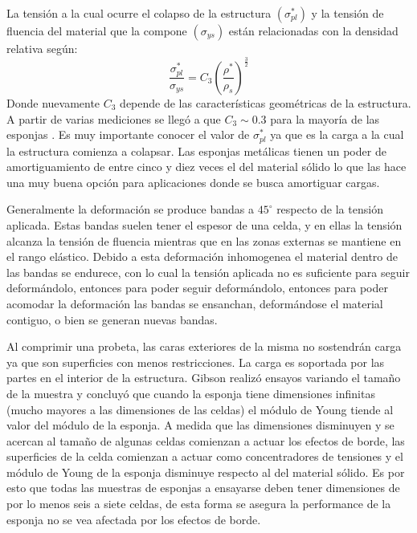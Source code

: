 \documentclass[a4paper,12pt,fleqn,twoside,openany]{book}
\begin{document}
La tensión a la cual ocurre el colapso de la estructura $(\sigma^*_{pl})$ y la tensión de fluencia del material que la compone $(\sigma_{ys})$  
están relacionadas con la densidad relativa \cite{duering} según:
\begin{equation}
 \frac{\sigma^*_{pl}}{\sigma_{ys}}=C_3 \left(\frac{\rho^*}{\rho_s} \right)^{\frac{3}{2}}
\end{equation}
Donde nuevamente $C_3$ depende de las características geométricas de la estructura. A partir de varias mediciones se llegó a que $C_3 \sim 0.3$ para
la mayoría de las esponjas \cite{gibson}. 
Es muy importante conocer el valor de $\sigma^*_{pl}$ ya que es la carga a la cual la estructura comienza a colapsar.  Las esponjas metálicas tienen 
un poder de amortiguamiento de entre cinco y diez veces el del material sólido \cite{design} lo que las hace una muy buena opción para aplicaciones 
donde se busca amortiguar cargas. 

Generalmente la deformación se produce bandas a $45^\circ$ respecto de la tensión aplicada. Estas bandas suelen tener el espesor de una celda, 
y en ellas la tensión alcanza la tensión de fluencia mientras que en las zonas externas se mantiene en el rango elástico. Debido a esta deformación inhomogenea el material dentro de las bandas se endurece, con lo cual la tensión aplicada no es suficiente para seguir deformándolo, entonces para poder seguir deformándolo, entonces para poder acomodar la deformación las bandas se ensanchan, deformándose el material contiguo, o bien se generan nuevas bandas.     


Al comprimir una probeta, las caras exteriores de la misma no sostendrán carga ya que son superficies con menos restricciones.
La carga es soportada por las partes en el interior de la estructura. Gibson \cite{gibson} realizó ensayos variando el tamaño de la muestra 
y concluyó que cuando la esponja tiene 
dimensiones infinitas (mucho mayores a las dimensiones de las celdas) el módulo de Young tiende al valor del módulo de la esponja. A medida que 
las dimensiones disminuyen y se acercan al tamaño de algunas celdas comienzan a actuar los efectos 
de borde, las superficies de la celda comienzan a actuar como concentradores de tensiones y el módulo de Young de la esponja disminuye respecto al del 
material sólido. Es por esto que todas las muestras de esponjas a ensayarse deben tener dimensiones de por lo menos seis a siete celdas, de esta 
forma se asegura la performance de la esponja no se vea afectada por los efectos de borde.
\end{document}
